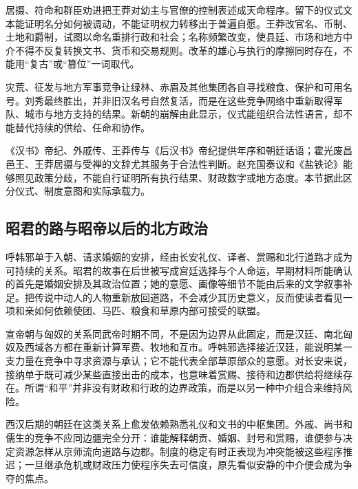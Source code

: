 居摄、符命和群臣劝进把王莽对幼主与官僚的控制表述成天命程序。留下的仪式文本能证明名分如何被调动，不能证明权力转移出于普遍自愿。王莽改官名、币制、土地和爵制，试图以命名重排行政和社会；名称频繁改变，使县廷、市场和地方中介不得不反复转换文书、货币和交易规则。改革的雄心与执行的摩擦同时存在，不能用“复古”或“篡位”一词取代。

灾荒、征发与地方军事竞争让绿林、赤眉及其他集团各自寻找粮食、保护和可用名号。刘秀最终胜出，并非旧汉名号自然复活，而是在这些竞争网络中重新取得军队、城市与地方支持的结果。新朝的崩解由此显示，仪式能组织合法性语言，却不能替代持续的供给、任命和协作。

\begin{sourcenote}[辅政与新朝的材料边界]
《汉书》帝纪、外戚传、王莽传与《后汉书》帝纪提供年序和朝廷话语；霍光废昌邑王、王莽居摄与受禅的文辞尤其服务于合法性判断。赵充国奏议和《盐铁论》能够照见政策分歧，不能自行证明所有执行结果、财政数字或地方态度。本节据此区分仪式、制度意图和实际承载力。
\end{sourcenote}

\subsection{昭君的路与昭帝以后的北方政治}

呼韩邪单于入朝、请求婚姻的安排，经由长安礼仪、译者、赏赐和北行道路才成为可持续的关系。昭君的故事在后世被写成宫廷选择与个人命运，早期材料所能确认的首先是婚姻安排及其政治位置；她的意愿、画像等细节不能由后来的文学叙事补足。把传说中动人的人物重新放回道路，不会减少其历史意义，反而使读者看见一项和亲如何依赖使团、马匹、粮食和草原内部可接受的联盟。

宣帝朝与匈奴的关系同武帝时期不同，不是因为边界从此固定，而是汉廷、南北匈奴及西域各方都在重新计算军费、牧地和互市。呼韩邪选择接近汉廷，能说明某一支力量在竞争中寻求资源与承认；它不能代表全部草原部众的意愿。对长安来说，接纳单于既可减少某些直接出击的成本，也意味着赏赐、接待和边郡供给将继续存在。所谓“和平”并非没有财政和行政的边界政策，而是以另一种中介组合来维持风险。

西汉后期的朝廷在这类关系上愈发依赖熟悉礼仪和文书的中枢集团。外戚、尚书和儒生的竞争不应同边疆完全分开：谁能解释朝贡、婚姻、封号和赏赐，谁便参与决定资源怎样从京师流向道路与边郡。制度的稳定有时正表现为冲突能被这些程序推迟；一旦继承危机或财政压力使程序失去可信度，原先看似安静的中介便会成为争夺的焦点。

